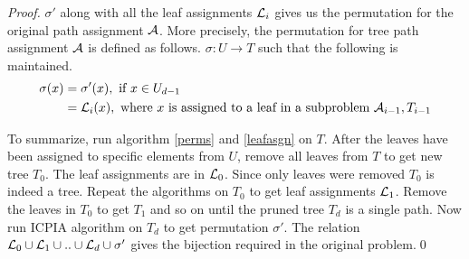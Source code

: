 \documentclass{llncs}
\def\cA{{\cal A}}
\def\cL{{\cal L}}
\begin{document}
\begin{proof}
\noindent
$\sigma'$ along with all the leaf assignments $\cL_i$
gives us the permutation for the original path assignment $\cA$.
More precisely, the permutation for tree path assignment $\cA$ is defined as
follows. $\sigma: U \rightarrow T$ such that the following
is maintained.
\begin{align*}
 \sigma(x) &= \sigma'(x),   \text{ if } x \in U_{d-1} \\
           &= \cL_i(x),     \text{ where $x$ is assigned to a leaf in a
             subproblem $\cA_{i-1}, T_{i-1}$}
\end{align*}

\noindent
To summarize, run algorithm \ref{perms} and
\ref{leafasgn} on $T$. After the leaves have been assigned to specific
elements from $U$, remove all leaves from $T$ to get new tree
$T_0$. The leaf assignments are in $\cL_0$. Since only leaves were removed $T_0$ is indeed a tree. Repeat
the algorithms on $T_0$ to get leaf assignments $\cL_{1}$. Remove the
leaves in $T_0$ to get $T_1$ and so on until the pruned tree $T_d$
is a single path. Now run ICPIA algorithm on $T_d$ to get
permutation $\sigma'$. The relation $\cL_0 \cup \cL_1 \cup .. \cup
\cL_{d} \cup \sigma'$ gives the bijection required in the original problem.\qed
\end{proof}
\end{document}
